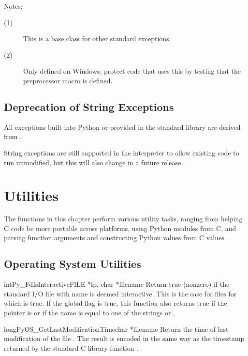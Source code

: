 \documentclass{manual}
\begin{document}
\noindent
Notes:
\begin{description}
\item[(1)]
  This is a base class for other standard exceptions.

\item[(2)]
  Only defined on Windows; protect code that uses this by testing that
  the preprocessor macro  is defined.
\end{description}


\section{Deprecation of String Exceptions}

All exceptions built into Python or provided in the standard library
are derived from .

String exceptions are still supported in the interpreter to allow
existing code to run unmodified, but this will also change in a future 
release.


\chapter{Utilities \label{utilities}}

The functions in this chapter perform various utility tasks, ranging
from helping C code be more portable across platforms, using Python
modules from C, and parsing function arguments and constructing Python
values from C values.


\section{Operating System Utilities \label{os}}

\begin{cfuncdesc}{int}{Py_FdIsInteractive}{FILE *fp, char *filename}
Return true (nonzero) if the standard I/O file  with name
 is deemed interactive.  This is the case for files for
which  is true.  If the global flag
 is true, this function also returns true if
the  pointer is \NULL{} or if the name is equal to one of
the strings  or .
\end{cfuncdesc}

\begin{cfuncdesc}{long}{PyOS_GetLastModificationTime}{char *filename}
Return the time of last modification of the file .
The result is encoded in the same way as the timestamp returned by
the standard C library function .
\end{cfuncdesc}
\end{document}
